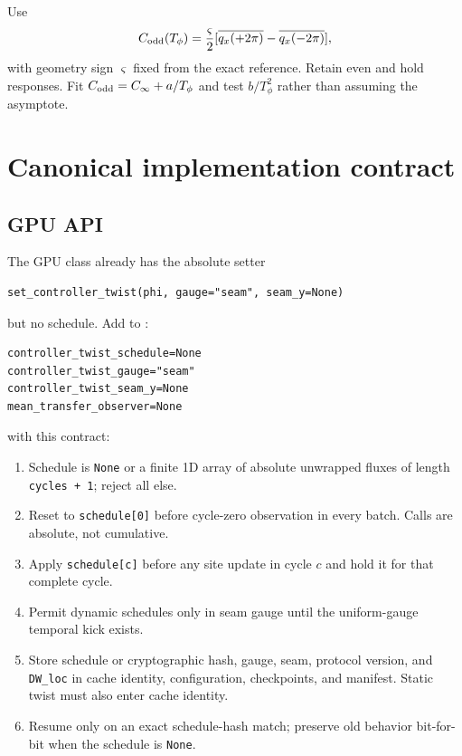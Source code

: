 \documentclass[aps,prb,onecolumn,nofootinbib,superscriptaddress]{revtex4-2}
\newcommand{\code}[1]{\texttt{#1}}
\begin{document}
Use
\begin{equation}
 C_{\rm odd}(T_\phi)=\frac{\varsigma}{2}
 [\overline{q_x(+2\pi)}-\overline{q_x(-2\pi)}],
\end{equation}
with geometry sign $\varsigma$ fixed from the exact reference.  Retain even and
hold responses.  Fit $C_{\rm odd}=C_\infty+a/T_\phi$ and test
$b/T_\phi^2$ rather than assuming the asymptote.

\section{Canonical implementation contract}
\label{sec:api}

\subsection{GPU API}

The GPU class already has the absolute setter
\begin{verbatim}
set_controller_twist(phi, gauge="seam", seam_y=None)
\end{verbatim}
but no schedule.  Add to
:
\begin{verbatim}
controller_twist_schedule=None
controller_twist_gauge="seam"
controller_twist_seam_y=None
mean_transfer_observer=None
\end{verbatim}
with this contract:
\begin{enumerate}
 \item Schedule is \code{None} or a finite 1D array of absolute unwrapped
 fluxes of length \code{cycles + 1}; reject all else.
 \item Reset to \code{schedule[0]} before cycle-zero observation in every batch.
 Calls are absolute, not cumulative.
 \item Apply \code{schedule[c]} before any site update in cycle $c$ and hold it
 for that complete cycle.
 \item Permit dynamic schedules only in seam gauge until the uniform-gauge
 temporal kick exists.
 \item Store schedule or cryptographic hash, gauge, seam, protocol version, and
 \code{DW\_loc} in cache identity, configuration, checkpoints, and manifest.
 Static twist must also enter cache identity.
 \item Resume only on an exact schedule-hash match; preserve old behavior
 bit-for-bit when the schedule is \code{None}.
\end{enumerate}
\end{document}
